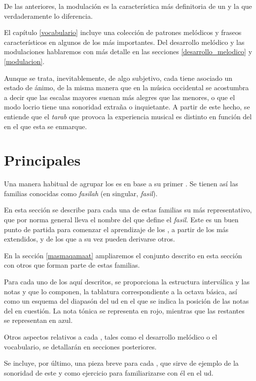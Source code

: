 De las anteriores, la modulación es la característica más definitoria de un \maqam y la que verdaderamente lo diferencia.

El capítulo \ref{vocabulario} incluye una colección de patrones melódicos y fraseos característicos en algunos de los \maqamaat más importantes. Del desarrollo melódico y las modulaciones hablaremos con más detalle en las secciones \ref{desarrollo_melodico} y \ref{modulacion}.

Aunque se trata, inevitablemente, de algo subjetivo, cada \maqam tiene asociado un estado de ánimo, de la misma manera que en la música occidental se acostumbra a decir que las escalas mayores suenan más alegres que las menores, o que el modo locrio tiene una sonoridad extraña o inquietante. A partir de este hecho, se entiende que el \emph{tarab} que provoca la experiencia musical es distinto en función del \maqam en el que esta se enmarque.

\section{Principales \maqamaat}

Una manera habitual de agrupar los \maqamaat es en base a su primer \yinsb. Se tienen así las familias conocidas como \emph{fasilah} (en singular, \emph{fasil}).

En esta sección se describe para cada una de estas familias su \maqam más representativo, que por norma general lleva el nombre del \yins que define el \emph{fasil}. Este es un buen punto de partida para comenzar el aprendizaje de los \maqamaatb, a partir de los más extendidos, y de los que a su vez pueden derivarse otros.

En la sección \ref{masmaqamaat} ampliaremos el conjunto descrito en esta sección con otros \maqamaat que forman parte de estas familias.

Para cada uno de los \maqamaat aquí descritos, se proporciona la estructura interválica y las notas y \ashnas que lo componen, la tablatura correspondiente a la octava básica, así como un esquema del diapasón del ud en el que se indica la posición de las notas del \maqam en cuestión. La nota tónica se representa en rojo, mientras que las restantes se representan en azul.

Otros aspectos relativos a cada \maqam, tales como el desarrollo melódico o el vocabulario, se detallarán en secciones posteriores.

Se incluye, por último, una pieza breve para cada \maqamb, que sirve de ejemplo de la sonoridad de este y como ejercicio para familiarizarse con él en el ud.

